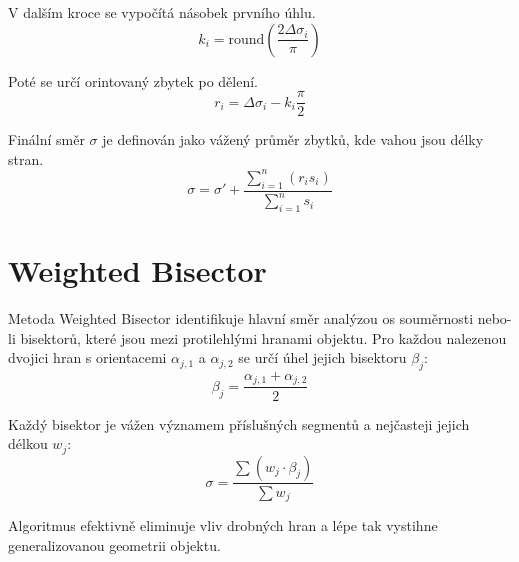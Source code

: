 \documentclass[12pt, a4paper]{article}
\begin{document}
\noindent V dalším kroce se vypočítá násobek prvního úhlu.
\vspace{1cm}
$$ k_i = \text{round} \left( \frac{2 \Delta \sigma_i}{\pi} \right) $$
\vspace{1cm}

\noindent Poté se určí orintovaný zbytek po dělení.
\vspace{1cm}
$$ r_i = \Delta\sigma_i - k_i \frac{\pi}{2} $$
\vspace{1cm}

\noindent Finální směr $\sigma$ je definován jako vážený průměr zbytků, kde vahou jsou délky stran.
\vspace{1cm}
$$ \sigma = \sigma' + \frac{\sum_{i=1}^{n} (r_i s_i)}{\sum_{i=1}^{n} s_i} $$
\vspace{1cm}

\newpage
\section {Weighted Bisector}
\vspace{1cm}
Metoda Weighted Bisector identifikuje hlavní směr analýzou os souměrnosti nebo-li bisektorů, které jsou mezi protilehlými hranami objektu. Pro každou nalezenou dvojici hran s orientacemi $\alpha_{j,1}$ a $\alpha_{j,2}$ se určí úhel jejich bisektoru $\beta_j$:
\vspace{1cm}
$$ \beta_j = \frac{\alpha_{j,1} + \alpha_{j,2}}{2} $$
\vspace{1cm}

\noindent Každý bisektor je vážen významem příslušných segmentů a nejčasteji jejich délkou $w_j$:
\vspace{1cm}
$$ \sigma = \frac{\sum (w_j \cdot \beta_j)}{\sum w_j} $$
\vspace{1cm}

\noindent Algoritmus efektivně eliminuje vliv drobných hran a lépe tak vystihne generalizovanou geometrii objektu. 

\newpage
\end{document}
